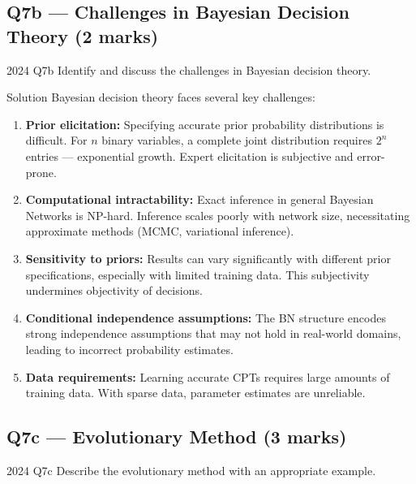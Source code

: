 \documentclass[12pt,a4paper]{article}
\begin{document}
\subsection{Q7b --- Challenges in Bayesian Decision Theory (2 marks)}

\begin{qbox}{2024 Q7b}
Identify and discuss the challenges in Bayesian decision theory.
\end{qbox}

\begin{solbox}{Solution}
Bayesian decision theory faces several key challenges:
\begin{enumerate}
  \item \textbf{Prior elicitation:} Specifying accurate prior probability distributions is difficult. For $n$ binary variables, a complete joint distribution requires $2^n$ entries — exponential growth. Expert elicitation is subjective and error-prone.
  \item \textbf{Computational intractability:} Exact inference in general Bayesian Networks is NP-hard. Inference scales poorly with network size, necessitating approximate methods (MCMC, variational inference).
  \item \textbf{Sensitivity to priors:} Results can vary significantly with different prior specifications, especially with limited training data. This subjectivity undermines objectivity of decisions.
  \item \textbf{Conditional independence assumptions:} The BN structure encodes strong independence assumptions that may not hold in real-world domains, leading to incorrect probability estimates.
  \item \textbf{Data requirements:} Learning accurate CPTs requires large amounts of training data. With sparse data, parameter estimates are unreliable.
\end{enumerate}
\end{solbox}

\subsection{Q7c --- Evolutionary Method (3 marks)}

\begin{qbox}{2024 Q7c}
Describe the evolutionary method with an appropriate example.
\end{qbox}
\end{document}
